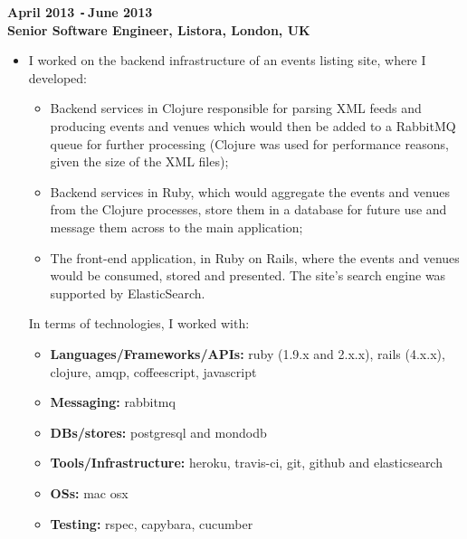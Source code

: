 \documentclass{res}
\def\Minus{\texttt{-}\,}
\begin{document}
\begin{resume}
  {\bf April 2013 \Minus June 2013}\\
  {\bf Senior Software Engineer, Listora, London, UK}
    \begin{itemize}
      \item[] I worked on the backend infrastructure of an events listing site,
      where I developed:
      \begin{itemize}
        \item Backend services in Clojure responsible for parsing XML feeds and
        producing events and venues which would then be added to a RabbitMQ
        queue for further processing (Clojure was used for performance reasons,
        given the size of the XML files);
        \item Backend services in Ruby, which would aggregate the events and
        venues from the Clojure processes, store them in a database for future
        use and message them across to the main application;
        \item The front-end application, in Ruby on Rails, where the events and
        venues would be consumed, stored and presented. The site's search
        engine was supported by ElasticSearch.
      \end{itemize}
      In terms of technologies, I worked with:
      \begin{itemize}
        \item[] {\bf Languages/Frameworks/APIs:} ruby (1.9.x and 2.x.x), rails
          (4.x.x), clojure, amqp, coffeescript, javascript
        \item[] {\bf Messaging:} rabbitmq
        \item[] {\bf DBs/stores:} postgresql and mondodb
        \item[] {\bf Tools/Infrastructure:} heroku, travis-ci, git, github and
          elasticsearch
        \item[] {\bf OSs:} mac osx
        \item[] {\bf Testing:} rspec, capybara, cucumber
      \end{itemize}
    \end{itemize}


\end{resume}
\end{document}
